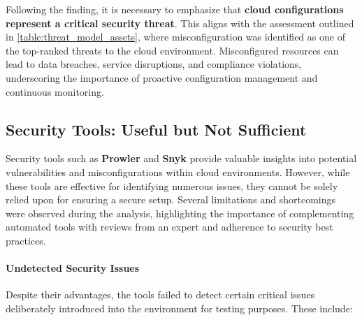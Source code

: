 Following the finding, it is necessary to emphasize that \textbf{cloud configurations represent a critical security threat}. This aligns with the assessment outlined in \ref{table:threat_model_assets}, where misconfiguration was identified as one of the top-ranked threats to the cloud environment. Misconfigured resources can lead to data breaches, service disruptions, and compliance violations, underscoring the importance of proactive configuration management and continuous monitoring.

\newpage
\subsection{Security Tools: Useful but Not Sufficient}

Security tools such as \textbf{Prowler} and \textbf{Snyk} provide valuable insights into potential vulnerabilities and misconfigurations within cloud environments. However, while these tools are effective for identifying numerous issues, they cannot be solely relied upon for ensuring a secure setup. Several limitations and shortcomings were observed during the analysis, highlighting the importance of complementing automated tools with reviews from an expert and adherence to security best practices.

\paragraph{Undetected Security Issues}

Despite their advantages, the tools failed to detect certain critical issues deliberately introduced into the environment for testing purposes. These include:

